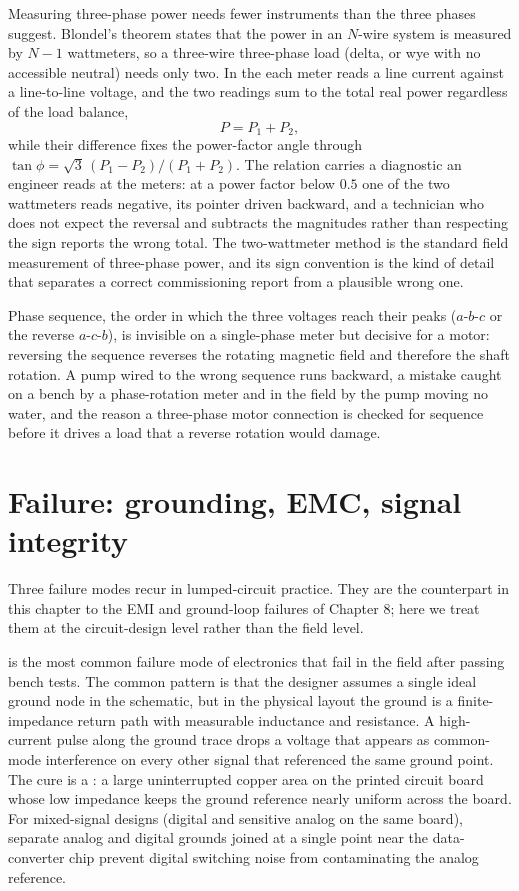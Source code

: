 Measuring three-phase power needs fewer instruments than the three phases
suggest. Blondel's theorem states that the power in an $N$-wire system is
measured by $N-1$ wattmeters, so a three-wire three-phase load (delta, or
wye with no accessible neutral) needs only two. In the
 each meter reads a line current against a
line-to-line voltage, and the two readings sum to the total real power
regardless of the load balance,
\[
P = P_1 + P_2,
\]
while their difference fixes the power-factor angle through $\tan\phi =
\sqrt{3}\,(P_1 - P_2)/(P_1 + P_2)$. The relation carries a diagnostic an
engineer reads at the meters: at a power factor below $0.5$ one of the two
wattmeters reads negative, its pointer driven backward, and a technician who
does not expect the reversal and subtracts the magnitudes rather than
respecting the sign reports the wrong total. The two-wattmeter method is the
standard field measurement of three-phase power, and its sign convention is
the kind of detail that separates a correct commissioning report from a
plausible wrong one.

Phase sequence, the order in which the three voltages reach their peaks
($a$-$b$-$c$ or the reverse $a$-$c$-$b$), is invisible on a single-phase
meter but decisive for a motor: reversing the sequence reverses the rotating
magnetic field and therefore the shaft rotation. A pump wired to the wrong
sequence runs backward, a mistake caught on a bench by a phase-rotation
meter and in the field by the pump moving no water, and the reason a
three-phase motor connection is checked for sequence before it drives a load
that a reverse rotation would damage.

\section{Failure: grounding, EMC, signal integrity}

Three failure modes recur in lumped-circuit practice. They are the
counterpart in this chapter to the EMI and ground-loop failures of
Chapter 8; here we treat them at the circuit-design level rather than
the field level.

 is the most common failure mode of
electronics that fail in the field after passing bench tests. The
common pattern is that the designer assumes a single ideal ground
node in the schematic, but in the physical layout the ground is a
finite-impedance return path with measurable inductance and
resistance. A high-current pulse along the ground trace drops a
voltage that appears as common-mode interference on every other
signal that referenced the same ground point. The cure is a
: a large uninterrupted copper area on the
printed circuit board whose low impedance keeps the ground reference
nearly uniform across the board. For mixed-signal designs (digital
and sensitive analog on the same board), separate analog and digital
grounds joined at a single point near the data-converter chip prevent
digital switching noise from contaminating the analog reference.

